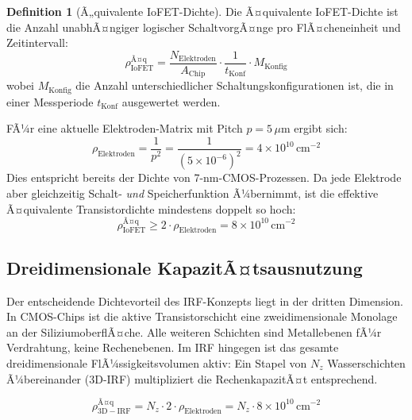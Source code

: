 ﻿\documentclass[a4paper,12pt]{scrreprt}
\theoremstyle{definition}
\newtheorem{definition}{Definition}[section]
\begin{document}
\begin{definition}[Ã„quivalente IoFET-Dichte]
	Die Ã¤quivalente IoFET-Dichte ist die Anzahl unabhÃ¤ngiger logischer
	SchaltvorgÃ¤nge pro FlÃ¤cheneinheit und Zeitintervall:
	\begin{equation}
		\rho_{\mathrm{IoFET}}^{\mathrm{Ã¤q}} = \frac{N_{\mathrm{Elektroden}}}{A_{\mathrm{Chip}}} \cdot
		\frac{1}{t_{\mathrm{Konf}}} \cdot M_{\mathrm{Konfig}}
		\label{eq:aequivalente_dichte}
	\end{equation}
	wobei $M_{\mathrm{Konfig}}$ die Anzahl unterschiedlicher Schaltungskonfigurationen
	ist, die in einer Messperiode $t_{\mathrm{Konf}}$ ausgewertet werden.
\end{definition}

FÃ¼r eine aktuelle Elektroden-Matrix mit Pitch $p = 5\,\mu$m ergibt sich:
\begin{equation}
	\rho_{\mathrm{Elektroden}} = \frac{1}{p^2} = \frac{1}{(5 \times 10^{-6})^2}
	= 4 \times 10^{10}\,\text{cm}^{-2}
	\label{eq:elektrodendichte}
\end{equation}
Dies entspricht bereits der Dichte von 7-nm-CMOS-Prozessen. Da jede Elektrode
aber gleichzeitig Schalt- \emph{und} Speicherfunktion Ã¼bernimmt, ist die
effektive Ã¤quivalente Transistordichte mindestens doppelt so hoch:
\begin{equation}
	\rho_{\mathrm{IoFET}}^{\mathrm{Ã¤q}} \geq 2 \cdot \rho_{\mathrm{Elektroden}}
	= 8 \times 10^{10}\,\text{cm}^{-2}
	\label{eq:effektive_dichte}
\end{equation}

\subsection{Dreidimensionale KapazitÃ¤tsausnutzung}

Der entscheidende Dichtevorteil des IRF-Konzepts liegt in der dritten Dimension.
In CMOS-Chips ist die aktive Transistorschicht eine zweidimensionale Monolage an
der SiliziumoberflÃ¤che. Alle weiteren Schichten sind Metallebenen fÃ¼r Verdrahtung,
keine Rechenebenen. Im IRF hingegen ist das gesamte dreidimensionale FlÃ¼ssigkeitsvolumen
aktiv: Ein Stapel von $N_z$ Wasserschichten Ã¼bereinander (3D-IRF) multipliziert
die RechenkapazitÃ¤t entsprechend.

\begin{equation}
	\rho_{\mathrm{3D-IRF}}^{\mathrm{Ã¤q}} = N_z \cdot 2 \cdot \rho_{\mathrm{Elektroden}}
	= N_z \cdot 8 \times 10^{10}\,\text{cm}^{-2}
	\label{eq:dreidimensionale_dichte}
\end{equation}
\end{document}
